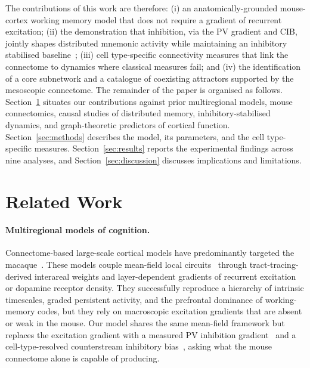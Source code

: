 \documentclass[11pt]{article}
\begin{document}
The contributions of this work are therefore: (i) an anatomically-grounded mouse-cortex working memory model that does not require a gradient of recurrent excitation; (ii) the demonstration that inhibition, via the PV gradient and CIB, jointly shapes distributed mnemonic activity while maintaining an inhibitory stabilised baseline~\cite{tsodyks1997paradoxical,sanzeni2020inhibition}; (iii) cell type-specific connectivity measures that link the connectome to dynamics where classical measures fail; and (iv) the identification of a core subnetwork and a catalogue of coexisting attractors supported by the mesoscopic connectome. The remainder of the paper is organised as follows. Section~\ref{sec:relwork} situates our contributions against prior multiregional models, mouse connectomics, causal studies of distributed memory, inhibitory-stabilised dynamics, and graph-theoretic predictors of cortical function. Section~\ref{sec:methods} describes the model, its parameters, and the cell type-specific measures. Section~\ref{sec:results} reports the experimental findings across nine analyses, and Section~\ref{sec:discussion} discusses implications and limitations.

\section{Related Work}\label{sec:relwork}

\paragraph{Multiregional models of cognition.}
Connectome-based large-scale cortical models have predominantly targeted the macaque~\cite{murray2014hierarchy,mejias2022mechanisms,froudistwalsh2021dopamine}. These models couple mean-field local circuits~\cite{wang2002probabilistic,wongwang2006recurrent} through tract-tracing-derived interareal weights and layer-dependent gradients of recurrent excitation or dopamine receptor density. They successfully reproduce a hierarchy of intrinsic timescales, graded persistent activity, and the prefrontal dominance of working-memory codes, but they rely on macroscopic excitation gradients that are absent or weak in the mouse. Our model shares the same mean-field framework but replaces the excitation gradient with a measured PV inhibition gradient~\cite{kim2017braintype} and a cell-type-resolved counterstream inhibitory bias~\cite{mejias2022mechanisms,wang2020macroscopic}, asking what the mouse connectome alone is capable of producing.
\end{document}
